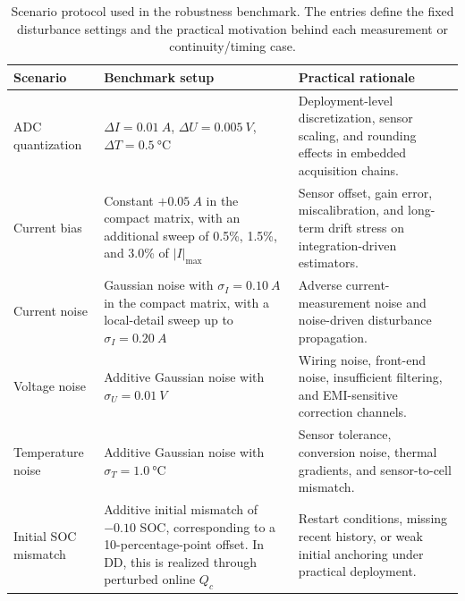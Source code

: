 \documentclass[
    a4paper,
    12pt,
    titlepage,
    bibliography=totoc,
    twoside=on,
    parskip=false,
    numbers=noenddot,
    cleardoublepage=empty,
    DIV=12,
    BCOR=12.0mm,
    headheight=36pt,
    headings=openright
]{scrreprt}
\begin{document}
\begin{table}[H]
    \centering
    \small
    \caption[Robustness-benchmark scenario protocol.]{Scenario protocol used in the robustness benchmark. The entries define the fixed disturbance settings and the practical motivation behind each measurement or continuity/timing case.}
    \label{tab:robustness_scenario_protocol}
    \begin{tabularx}{\textwidth}{>{\raggedright\arraybackslash}p{2.6cm}>{\raggedright\arraybackslash}X>{\raggedright\arraybackslash}X}
        \toprule
        Scenario & Benchmark setup & Practical rationale \\
        \midrule
        ADC quantization & $\Delta I=\SI{0.01}{A}$, $\Delta U=\SI{0.005}{V}$, $\Delta T=\SI{0.5}{\celsius}$ & Deployment-level discretization, sensor scaling, and rounding effects in embedded acquisition chains.\autocite{BQ7961616SeriesBattery2023,DesignConsiderationsCurrent,10sBatteryPack} \\
        Current bias & Constant $+\SI{0.05}{A}$ in the compact matrix, with an additional sweep of 0.5\%, 1.5\%, and 3.0\% of $|I|_{\max}$ & Sensor offset, gain error, miscalibration, and long-term drift stress on integration-driven estimators.\autocite{DesignConsiderationsCurrent,TMCS11083Functional,TLE4972HighPrecision} \\
        Current noise & Gaussian noise with $\sigma_I=\SI{0.10}{A}$ in the compact matrix, with a local-detail sweep up to $\sigma_I=\SI{0.20}{A}$ & Adverse current-measurement noise and noise-driven disturbance propagation.\autocite{liRobustnessSOCEstimation2015,naseriReliableWirelessBMS2025} \\
        Voltage noise & Additive Gaussian noise with $\sigma_U=\SI{0.01}{V}$ & Wiring noise, front-end noise, insufficient filtering, and EMI-sensitive correction channels.\autocite{liRobustnessSOCEstimation2015,BQ7961616SeriesBattery2023,aielloElectromagneticSusceptibilityBattery2020} \\
        Temperature noise & Additive Gaussian noise with $\sigma_T=\SI{1.0}{\celsius}$ & Sensor tolerance, conversion noise, thermal gradients, and sensor-to-cell mismatch.\autocite{10sBatteryPack,wangFusionEstimationLithiumion2022} \\
        Initial SOC mismatch & Additive initial mismatch of $-0.10$ SOC, corresponding to a 10-percentage-point offset. In DD, this is realized through perturbed online $Q_c$ & Restart conditions, missing recent history, or weak initial anchoring under practical deployment.\autocite{liRobustnessSOCEstimation2015,gaoEnhancedStateofchargeEstimation2022} \\

\end{tabularx}
\end{table}
\end{document}
